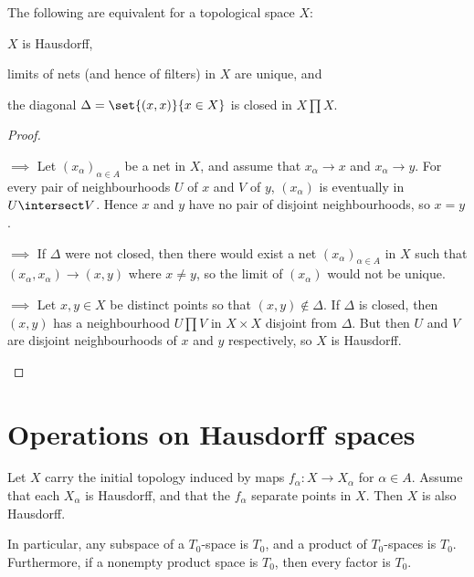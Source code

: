 \documentclass[article, a4paper, 11pt, oneside]{memoir}
\numberwithin{equation}{chapter}
\begin{document}
\begin{proposition}
    \label{thm:Hausdorff-equivalent-properties}
    The following are equivalent for a topological space $X$:
    \begin{enumprop}
        \item \label{enum:T2-space} $X$ is Hausdorff,
        \item \label{enum:T2-limits_unique} limits of nets (and hence of filters) in $X$ are unique, and
        \item \label{enum:T2-closed_diagonal} the diagonal $\Delta = \set{(x,x)}{x \in X}$ is closed in $X \prod X$.
    \end{enumprop}
\end{proposition}

\begin{proof}
\begin{proofsec}
    \item[\subcref{enum:T2-space} $\implies$ \subcref{enum:T2-limits_unique}]
    Let $(x_\alpha)_{\alpha \in A}$ be a net in $X$, and assume that $x_\alpha \to x$ and $x_\alpha \to y$. For every pair of neighbourhoods $U$ of $x$ and $V$ of $y$, $(x_\alpha)$ is eventually in $U \intersect V$. Hence $x$ and $y$ have no pair of disjoint neighbourhoods, so $x = y$.

    \item[\subcref{enum:T2-limits_unique} $\implies$ \subcref{enum:T2-closed_diagonal}]
    If $\Delta$ were not closed, then there would exist a net $(x_\alpha)_{\alpha \in A}$ in $X$ such that $(x_\alpha, x_\alpha) \to (x,y)$ where $x \neq y$, so the limit of $(x_\alpha)$ would not be unique.

    \item[\subcref{enum:T2-closed_diagonal} $\implies$ \subcref{enum:T2-space}]
    Let $x,y \in X$ be distinct points so that $(x,y) \not\in \Delta$. If $\Delta$ is closed, then $(x,y)$ has a neighbourhood $U \prod V$ in $X \times X$ disjoint from $\Delta$. But then $U$ and $V$ are disjoint neighbourhoods of $x$ and $y$ respectively, so $X$ is Hausdorff.
\end{proofsec}
\end{proof}


\section{Operations on Hausdorff spaces}

\begin{proposition} %
    Let $X$ carry the initial topology induced by maps $f_\alpha \colon X \to X_\alpha$ for $\alpha \in A$. Assume that each $X_\alpha$ is Hausdorff, and that the $f_\alpha$ separate points in $X$. Then $X$ is also Hausdorff.

    In particular, any subspace of a $T_0$-space is $T_0$, and a product of $T_0$-spaces is $T_0$. Furthermore, if a nonempty product space is $T_0$, then every factor is $T_0$.
\end{proposition}
\end{document}
